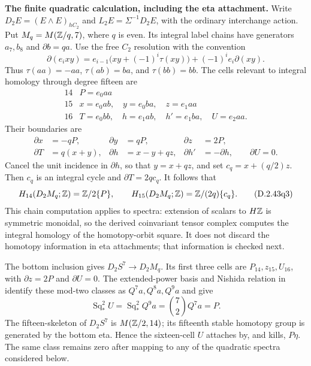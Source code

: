 \medskip\noindent
\textbf{The finite quadratic calculation, including the eta attachment.}
Write $D_2E=(E\wedge E)_{hC_2}$ and $L_2E=\Sigma^{-1}D_2E$,
with the ordinary interchange action.  Put $M_q=M(\mathbb Z/q,7)$,
where $q$ is even.  Its integral label chains have generators
$a_7,b_8$ and $\partial b=qa$.  Use the free $C_2$ resolution
with the convention
\[
 \partial(e_i xy)=e_{i-1}\bigl(xy+(-1)^i\tau(xy)\bigr)
                   +(-1)^ie_i\partial(xy).
 \tag{D.2.43q1}
\]
Thus $\tau(aa)=-aa$, $\tau(ab)=ba$, and $\tau(bb)=bb$.
The cells relevant to integral homology through degree fifteen are
\[
\begin{array}{c|l}
14&P=e_0aa\\
15&x=e_0ab,\quad y=e_0ba,\quad z=e_1aa\\
16&T=e_0bb,\quad h=e_1ab,\quad h'=e_1ba,\quad U=e_2aa.
\end{array}
\]
Their boundaries are
\[
\begin{aligned}
 \partial x&=-qP,&\partial y&=qP,&\partial z&=2P,\\
 \partial T&=q(x+y),&\partial h&=x-y+qz,
       &\partial h'&=-\partial h,\qquad\partial U=0.
\end{aligned}
\tag{D.2.43q2}
\]
Cancel the unit incidence in $\partial h$, so that $y=x+qz$,
and set $c_q=x+(q/2)z$.  Then $c_q$ is an integral cycle and
$\partial T=2q c_q$.  It follows that
\[
 H_{14}(D_2M_q;\mathbb Z)=\mathbb Z/2\{P\},\qquad
 H_{15}(D_2M_q;\mathbb Z)=\mathbb Z/(2q)\{c_q\}.
 \tag{D.2.43q3}
\]
This chain computation applies to spectra: extension of scalars
to $H\mathbb Z$ is symmetric monoidal, so the derived coinvariant
tensor complex computes the integral homology of the
homotopy-orbit square.  It does not discard the homotopy
information in eta attachments; that information is checked next.

The bottom inclusion gives $D_2S^7\to D_2M_q$.  Its first three
cells are $P_{14},z_{15},U_{16}$, with $\partial z=2P$ and
$\partial U=0$.  The extended-power basis and Nishida relation
in \cite[\S1.4, Lemma~1.4.1 and the following displayed relation,
p.~4]{EH5Behrens2012} identify these mod-two classes as
$Q^7a,Q^8a,Q^9a$ and give
\[
 \operatorname{Sq}_*^2U
  =\operatorname{Sq}_*^2Q^9a
  =\binom72 Q^7a=P.
 \tag{D.2.43q4}
\]
The fifteen-skeleton of $D_2S^7$ is $M(\mathbb Z/2,14)$;
its fifteenth stable homotopy group is generated by the bottom
eta.  Hence the sixteen-cell $U$ attaches by, and kills, $P\eta$.
The same class remains zero after mapping to any of the quadratic
spectra considered below.


